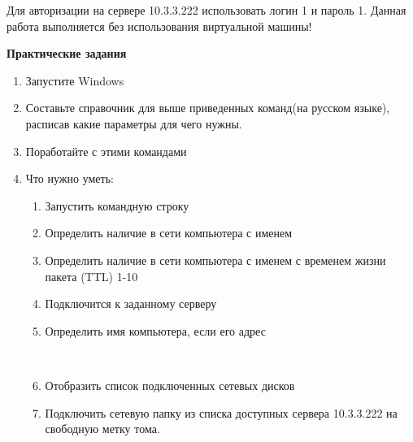 \documentclass[a4paper,12pt]{article}
\begin{document}
  \begin{flushleft}
   Для авторизации на сервере 10.3.3.222 использовать логин 1 и пароль 1. Данная работа выполняется без использования виртуальной машины!
  \end{flushleft}


  \newpage

  \begin{center}
    {\bf Практические задания}
  \end{center}

  \begin{flushleft}
    \begin{enumerate} [1. ]
     \item Запустите Windows
     \item Составьте справочник для выше приведенных команд(на русском языке), расписав какие параметры для чего нужны.
     \item Поработайте с этими командами
     \item Что нужно уметь:
      \begin{enumerate} [\bf a. ]
        \item Запустить командную строку
        \item Определить наличие в сети компьютера с именем 
        \begin{flushleft}
        \end{flushleft}
        \item Определить наличие в сети компьютера с именем  с временем жизни пакета (TTL) 1-10
        \begin{flushleft}
        \end{flushleft}
        \item Подключится к заданному серверу 
        \item Определить имя компьютера, если его адрес 
        \begin{flushleft}
         \\
        \end{flushleft}
        \item Отобразить список подключенных сетевых дисков
        \begin{flushleft}
        \end{flushleft}
        \item Подключить сетевую папку из списка доступных сервера 10.3.3.222 на свободную метку тома.

\end{enumerate}
\end{enumerate}
\end{flushleft}
\end{document}
